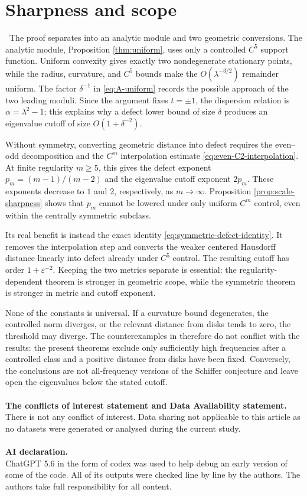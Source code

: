 \documentclass[12pt]{article}
\numberwithin{equation}{section}
\numberwithin{equation}{section}
\begin{document}
\section{Sharpness and scope}
\bigskip
\quad\,
The proof separates into an analytic module and two geometric conversions.
The analytic module, Proposition \ref{thm:uniform}, uses only a controlled
$C^5$ support function. Uniform convexity gives exactly two nondegenerate
stationary points, while the radius, curvature, and $C^5$ bounds make the
$O(\lambda^{-3/2})$ remainder uniform. The factor $\delta^{-1}$ in
\eqref{eq:A-uniform} records the possible approach of the two leading
moduli. Since the argument fixes $t=\pm1$, the dispersion relation is
$\alpha=\lambda^2-1$; this explains why a defect lower bound of size
$\delta$ produces an eigenvalue cutoff of size $O\left(1+\delta^{-2}\right)$.

Without symmetry, converting geometric distance into defect requires the
even--odd decomposition and the $C^m$ interpolation estimate
\eqref{eq:even-C2-interpolation}. At finite regularity $m\geq5$, this gives
the defect exponent $p_m=(m-1)/(m-2)$ and the eigenvalue cutoff exponent
$2p_m$. These exponents decrease to $1$ and $2$, respectively, as
$m\to\infty$. Proposition \ref{prop:scale-sharpness} shows that $p_m$ cannot
be lowered under only uniform $C^m$ control, even within the centrally
symmetric subclass.

Its real benefit is instead the exact identity
\eqref{eq:symmetric-defect-identity}.  It removes the interpolation step and
converts the weaker centered Hausdorff distance linearly into defect already
under $C^5$ control. The resulting cutoff has order
$1+\varepsilon^{-2}$. Keeping the two metrics separate is essential: the
regularity-dependent theorem is stronger in geometric scope, while the
symmetric theorem is stronger in metric and cutoff exponent.

None of the constants is universal. If a curvature bound degenerates, the
controlled norm diverges, or the relevant distance from disks tends to
zero, the threshold may diverge. The counterexamples in
\cite{ColbrookStepaniants,CaoDeDios} therefore do not conflict with the
results: the present theorems exclude only sufficiently high frequencies
after a controlled class and a positive distance from disks have been
fixed. Conversely, the conclusions are not all-frequency versions of the
Schiffer conjecture and leave open the eigenvalues below the stated cutoff.
\\ \\
\textbf{The conflicts of interest statement and Data Availability statement.}
\bigskip\\
\indent There is not any conflict of interest.
Data sharing not applicable to this article as no datasets were generated or analysed during the current study.
\\ \\
\textbf{AI declaration.}
\bigskip\\
\indent ChatGPT 5.6 in the form of codex was used to help debug an early version
of some of the code. All of its outputs were checked line by line by the authors. The authors
take full responsibility for all content.

\makeatletter
\def\@biblabel#1{#1.~}
\makeatother
\end{document}
